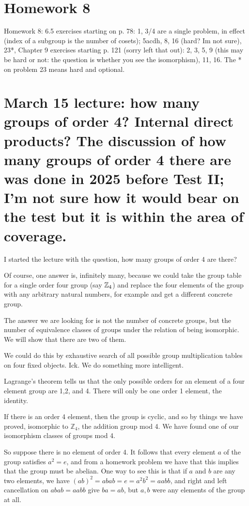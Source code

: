 \documentclass[12pt]{article}
\begin{document}
\section{Homework 8}

Homework 8: 6.5 exercises starting on p. 78: 1, 3/4 are a single problem, in effect (index of a subgroup is the number of cosets); 5acdh, 8, 16 (hard? Im not sure), 23*, Chapter 9 exercises starting p. 121 (sorry left that out): 2, 3, 5, 9 (this may be hard or not: the question is whether you see the isomorphism), 11, 16. The * on problem 23 means hard and optional.

\section{March 15 lecture:  how many groups of order 4?  Internal direct products?  The discussion of how many groups of order 4 there are was done in 2025 before Test II;  I'm not sure how it would bear on the test but it is within the area of coverage.}

I started the lecture with the question, how many groups of order 4 are there?

Of course, one answer is, infinitely many, because we could take the group table for a single order four group (say ${\tt \mathbb Z}_4$) and replace the four elements of the group with any arbitrary natural numbers, for example and get a different concrete group.

The answer we are looking for is not the number of concrete groups, but the number of equivalence classes of groups under the relation of being isomorphic.  We will show that there are two of them.

We could do this by exhaustive search of all possible group multiplication tables on four fixed objects.  Ick.  We do something more intelligent.

Lagrange's theorem tells us that the only possible orders for an element of a four element group are 1,2, and 4.
There will only be one order 1 element, the identity.  

If there is an order 4 element, then the group is cyclic,
and so by things we have proved, isomorphic to ${\mathbb Z}_4$, the addition group mod 4.  We have found one of our isomorphism classes of groups mod 4.  

So  suppose there is no element of order 4.  It follows that every element $a$ of the group satisfies $a^2 = e$,
and from a homework problem we have that this implies that the group must be abelian.   One way to see this is that if $a$ and $b$ are any two elements, we have $(ab)^2 = abab= e = a^2b^2 = aabb$, and right and left cancellation on
$abab=aabb$ give $ba=ab$, but $a,b$ were any elements of the group at all.
\end{document}
